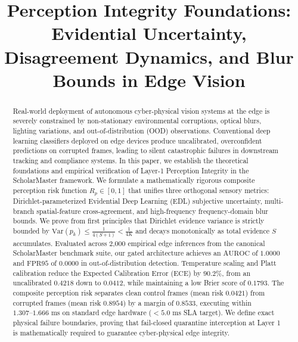 \documentclass[conference]{IEEEtran}
\begin{document}
\title{Perception Integrity Foundations: Evidential Uncertainty, Disagreement Dynamics, and Blur Bounds in Edge Vision}

\author{
}

\maketitle

\begin{abstract}
Real-world deployment of autonomous cyber-physical vision systems at the edge is severely constrained by non-stationary environmental corruptions, optical blurs, lighting variations, and out-of-distribution (OOD) observations. Conventional deep learning classifiers deployed on edge devices produce uncalibrated, overconfident predictions on corrupted frames, leading to silent catastrophic failures in downstream tracking and compliance systems. In this paper, we establish the theoretical foundations and empirical verification of Layer-1 Perception Integrity in the ScholarMaster framework. We formulate a mathematically rigorous composite perception risk function $R_p \in [0, 1]$ that unifies three orthogonal sensory metrics: Dirichlet-parameterized Evidential Deep Learning (EDL) subjective uncertainty, multi-branch spatial-feature cross-agreement, and high-frequency frequency-domain blur bounds. We prove from first principles that Dirichlet evidence variance is strictly bounded by $\mathrm{Var}(p_k) \le \frac{1}{4(S+1)} < \frac{1}{4K}$ and decays monotonically as total evidence $S$ accumulates. Evaluated across 2,000 empirical edge inferences from the canonical ScholarMaster benchmark suite, our gated architecture achieves an $\text{AUROC}$ of $1.0000$ and $\text{FPR95}$ of $0.0000$ in out-of-distribution detection. Temperature scaling and Platt calibration reduce the Expected Calibration Error ($\text{ECE}$) by $90.2\%$, from an uncalibrated $0.4218$ down to $0.0412$, while maintaining a low Brier score of $0.1793$. The composite perception risk separates clean control frames (mean risk $0.0421$) from corrupted frames (mean risk $0.8954$) by a margin of $0.8533$, executing within $1.307\text{--}1.666\text{ ms}$ on standard edge hardware ($<5.0\text{ ms}$ SLA target). We define exact physical failure boundaries, proving that fail-closed quarantine interception at Layer 1 is mathematically required to guarantee cyber-physical edge integrity.
\end{abstract}
\end{document}

